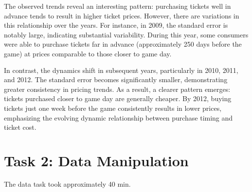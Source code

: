 \documentclass[
  12pt]{article}
\begin{document}
The observed trends reveal an interesting pattern: purchasing tickets
well in advance tends to result in higher ticket prices. However, there
are variations in this relationship over the years. For instance, in
2009, the standard error is notably large, indicating substantial
variability. During this year, some consumers were able to purchase
tickets far in advance (approximately 250 days before the game) at
prices comparable to those closer to game day.

In contrast, the dynamics shift in subsequent years, particularly in
2010, 2011, and 2012. The standard error becomes significantly smaller,
demonstrating greater consistency in pricing trends. As a result, a
clearer pattern emerges: tickets purchased closer to game day are
generally cheaper. By 2012, buying tickets just one week before the game
consistently results in lower prices, emphasizing the evolving dynamic
relationship between purchase timing and ticket cost.

\section{Task 2: Data Manipulation}\label{task-2-data-manipulation}

The data task took approximately 40 min.


  
\end{document}
